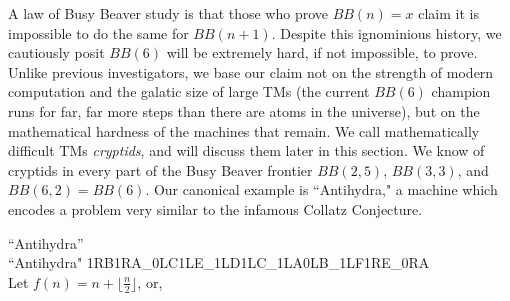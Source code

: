 
A law of Busy Beaver study is that those who prove $BB(n) = x$ claim it is impossible to do the same for $BB(n+1)$. Despite this ignominious history, we cautiously posit $BB(6)$ will be extremely hard, if not impossible, to prove. Unlike previous investigators, we base our claim not on the strength of modern computation and the galatic size of large TMs (the current $BB(6)$ champion runs for far, far more steps than there are atoms in the universe), but on the mathematical hardness of the machines that remain.
We call mathematically difficult TMs \textit{cryptids}, and will discuss them later in this section. We know of cryptids in every part of the Busy Beaver frontier $BB(2,5)$, $BB(3,3)$, and $BB(6,2) = BB(6)$. Our canonical example is ``Antihydra," a machine which encodes a problem very similar to the infamous Collatz Conjecture.

\begin{example}
    ``Antihydra'' \\
    ``Antihydra" 1RB1RA\_0LC1LE\_1LD1LC\_1LA0LB\_1LF1RE\_\-\-\-0RA \\
    Let $f(n) = n + \lfloor \frac{n}{2} \rfloor$, or, 
\end{example}